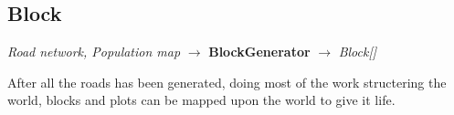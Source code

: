\subsection{Block}
\begin{center}
    \textit{Road network, Population map} $\rightarrow$ \textbf{BlockGenerator} $\rightarrow$ \textit{Block{[}{]}}
\end{center}

After all the roads has been generated, doing most of the work structering the world, blocks and plots can be mapped upon the world to give it life. 

